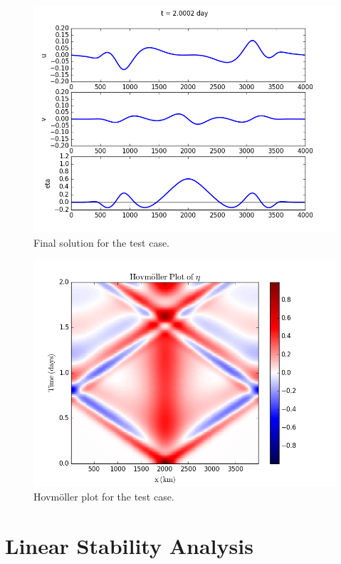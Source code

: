 \documentclass[letterpaper,10pt,english]{sphinxmanual}
\begin{document}
\begin{figure}[htbp]
\centering
\capstart

\includegraphics{ex1_fig1.png}
\caption{Final solution for the test case.}\end{figure}
\begin{figure}[htbp]
\centering
\capstart

\includegraphics{ex1_fig2.png}
\caption{Hovmöller plot for the test case.}\end{figure}


\chapter{Linear Stability Analysis}
\label{linear_stability::doc}\label{linear_stability:linear-stability-analysis}
\end{document}
